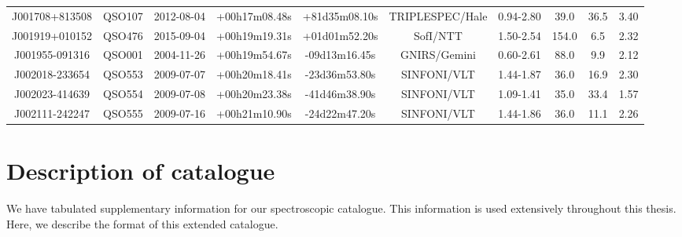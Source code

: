 \begin{landscape}
\begin{minipage}{\linewidth}
\begin{tabular}{cccccccccc}
    J001708+813508  &  QSO107 & 2012-08-04 &  +00h17m08.48s &  +81d35m08.10s &  TRIPLESPEC/Hale &  0.94-2.80 &      39.0 &  36.5 &  3.40 \\
    J001919+010152  &  QSO476 & 2015-09-04 &  +00h19m19.31s &  +01d01m52.20s &         SofI/NTT &  1.50-2.54 &     154.0 &   6.5 &  2.32 \\
    J001955-091316  &  QSO001 & 2004-11-26 &  +00h19m54.67s &  -09d13m16.45s &     GNIRS/Gemini &  0.60-2.61 &      88.0 &   9.9 &  2.12 \\
    J002018-233654  &  QSO553 & 2009-07-07 &  +00h20m18.41s &  -23d36m53.80s &      SINFONI/VLT &  1.44-1.87 &      36.0 &  16.9 &  2.30 \\
    J002023-414639  &  QSO554 & 2009-07-08 &  +00h20m23.38s &  -41d46m38.90s &      SINFONI/VLT &  1.09-1.41 &      35.0 &  33.4 &  1.57 \\
    J002111-242247  &  QSO555 & 2009-07-16 &  +00h21m10.90s &  -24d22m47.20s &      SINFONI/VLT &  1.44-1.86 &      36.0 &  11.1 &  2.26 \\
    \bottomrule
    \end{tabular}
    \end{minipage}
\end{landscape}

\section{Description of catalogue}

We have tabulated supplementary information for our spectroscopic catalogue.
This information is used extensively throughout this thesis. 
Here, we describe the format of this extended catalogue. 

